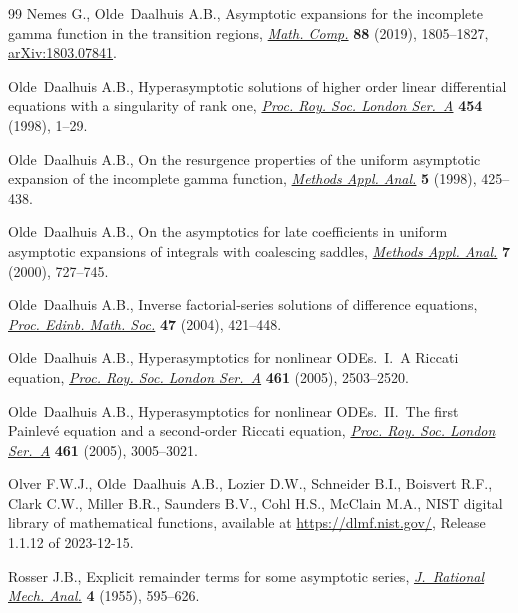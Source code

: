 \documentclass[11pt]{article}
\numberwithin{equation}{section}
\numberwithin{equation}{section}
\begin{document}
\begin{thebibliography}{99}
Nemes G., Olde~Daalhuis A.B., Asymptotic expansions for the incomplete gamma
 function in the transition regions, \href{https://doi.org/10.1090/mcom/3391}{\textit{Math. Comp.}} \textbf{88} (2019),
 1805--1827, \href{https://arxiv.org/abs/1803.07841}{arXiv:1803.07841}.

Olde~Daalhuis A.B., Hyperasymptotic solutions of higher order linear
 differential equations with a singularity of rank one, \href{https://doi.org/10.1098/rspa.1998.0145}{\textit{Proc. Roy.
 Soc. London Ser.~A}} \textbf{454} (1998), 1--29.

Olde~Daalhuis A.B., On the resurgence properties of the uniform asymptotic
 expansion of the incomplete gamma function, \href{https://doi.org/10.4310/MAA.1998.v5.n4.a7}{\textit{Methods Appl. Anal.}}
 \textbf{5} (1998), 425--438.

Olde~Daalhuis A.B., On the asymptotics for late coefficients in uniform
 asymptotic expansions of integrals with coalescing saddles,  \href{https://doi.org/10.4310/MAA.2000.v7.n4.a7}{\textit{Methods
 Appl. Anal.}} \textbf{7} (2000), 727--745.

Olde~Daalhuis A.B., Inverse factorial-series solutions of difference equations,
  \href{https://doi.org/10.1017/S0013091503000609}{\textit{Proc. Edinb. Math. Soc.}} \textbf{47} (2004), 421--448.

Olde~Daalhuis A.B., Hyperasymptotics for nonlinear {ODE}s.~{I}.~{A} {R}iccati
 equation, \href{https://doi.org/10.1098/rspa.2005.1462}{\textit{Proc. Roy. Soc. London Ser.~A}} \textbf{461} (2005),
 2503--2520.

Olde~Daalhuis A.B., Hyperasymptotics for nonlinear {ODE}s.~{II}.~{T}he first
 {P}ainlev\'e equation and a second-order {R}iccati equation, \href{https://doi.org/10.1098/rspa.2005.1463}{\textit{Proc.
 Roy. Soc. London Ser.~A}} \textbf{461} (2005), 3005--3021.

Olver F.W.J., Olde~Daalhuis A.B., Lozier D.W., Schneider B.I., Boisvert R.F.,
 Clark C.W., Miller B.R., Saunders B.V., Cohl H.S., McClain M.A., NIST digital
 library of mathematical functions, available at \url{https://dlmf.nist.gov/},
 Release 1.1.12 of 2023-12-15.

Rosser J.B., Explicit remainder terms for some asymptotic series,
 \href{https://doi.org/10.1512/iumj.1955.4.54021}{\textit{J.~Rational Mech. Anal.}} \textbf{4} (1955), 595--626.


\end{thebibliography}
\end{document}
